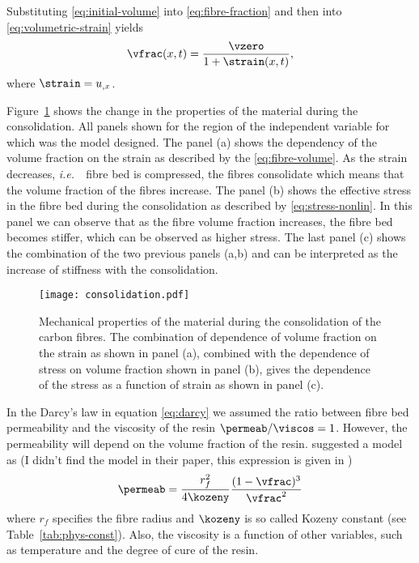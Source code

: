 \documentclass[twoside,a4paper,12pt,draft]{article}
\newcommand{\figref}[1]{Figure~\ref{#1}}
\newcommand{\tabref}[1]{Table~\ref{#1}}
\newcommand{\ie}{{\it i.e.\ }}
\newcommand{\note}[1]{{\color{red}(#1)}}
\newcommand{\note}[1]{}
\begin{document}
Substituting \eqref{eq:initial-volume} into \eqref{eq:fibre-fraction}
and then into \eqref{eq:volumetric-strain} yields
%
\begin{align}
  \vfrac(x,t) = \frac{\vzero}{1+\strain(x,t)}, \label{eq:fibre-volume}
\end{align}
%
where $\strain =  u_{,x}$.

\figref{fig:consolidation} shows the change in the properties of the material during the consolidation. All panels shown for the region of the independent variable for which was the model designed. The panel (a) shows the dependency of the volume fraction on the strain as described by the \eqref{eq:fibre-volume}. As the strain decreases, \ie\ fibre bed is compressed, the fibres consolidate which means that the volume fraction of the fibres increase. The panel (b) shows the effective stress in the fibre bed during the consolidation as described by \eqref{eq:stress-nonlin}. In this panel we can observe that as the fibre volume fraction increases, the fibre bed becomes stiffer, which can be observed as higher stress. The last panel (c) shows the combination of the two previous panels (a,b) and can be interpreted as the increase of stiffness with the consolidation.
%
\begin{figure}
  \centering
  \texttt{[image: consolidation.pdf]}
  \caption{Mechanical properties of the material during the consolidation of the carbon fibres. The combination of dependence of volume fraction on the strain as shown in panel (a), combined with the dependence of stress on volume fraction shown in panel (b), gives the dependence of the stress as a function of strain as shown in panel (c).}
  \label{fig:consolidation}
\end{figure}

In the Darcy's law in equation \eqref{eq:darcy} we assumed the ratio
between fibre bed permeability and the viscosity of the resin
$\permeab/\viscos=1$. However, the permeability will depend on the volume
fraction of the resin. \citet{Dave1987b} suggested a model as
%
\note{I didn't find the model in their paper, this expression is given in \citet{Hubert1999}}
%
\begin{align}
  \permeab = \frac{r_f^2}{4\kozeny} \frac{(1-\vfrac)^3}{\vfrac^2} \label{eq:permeability}
\end{align}
%
where $r_f$ specifies the fibre radius and $\kozeny$ is so called Kozeny
constant (see \tabref{tab:phys-const}). Also, the viscosity is a
function of other variables, such as temperature and the degree of
cure of the resin.
\end{document}

